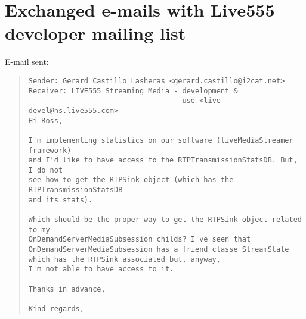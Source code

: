 \chapter{Exchanged e-mails with Live555 developer mailing list}\label{ANX:emailRoss}

E-mail sent:

\begin{quote}
\begin{verbatim}
Sender: Gerard Castillo Lasheras <gerard.castillo@i2cat.net>
Receiver: LIVE555 Streaming Media - development & 
									use <live-devel@ns.live555.com> 
Hi Ross,

I'm implementing statistics on our software (liveMediaStreamer framework) 
and I'd like to have access to the RTPTransmissionStatsDB. But, I do not
see how to get the RTPSink object (which has the RTPTransmissionStatsDB 
and its stats).

Which should be the proper way to get the RTPSink object related to my
OnDemandServerMediaSubsession childs? I've seen that 
OnDemandServerMediaSubsession has a friend classe StreamState 
which has the RTPSink associated but, anyway, 
I'm not able to have access to it.

Thanks in advance,

Kind regards,
\end{verbatim}
\end{quote} 

